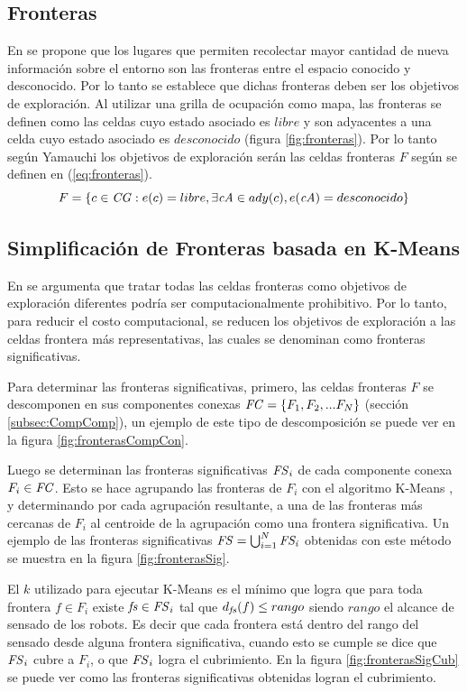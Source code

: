 \subsection{Fronteras}
En \cite{yamauchi1998frontier} se propone que los lugares que permiten
recolectar mayor cantidad de nueva información sobre el entorno son las
fronteras entre el espacio conocido y desconocido. Por lo tanto se establece que dichas
fronteras deben ser los objetivos de exploración.
Al utilizar una grilla de ocupación como mapa, las fronteras se definen como las
celdas cuyo estado asociado es $libre$ y son adyacentes a una celda cuyo estado
asociado es $desconocido$ (figura \ref{fig:fronteras}).
Por lo tanto según Yamauchi los objetivos de exploración serán las celdas
fronteras $F$ según se definen en (\ref{eq:fronteras}).
\begin{equation} 
  F = \{ c \in \mathit{CG} : e(c) = libre, \exists \mathit{cA} \in ady(c), e(\mathit{cA}) = desconocido  \}
  \label{eq:fronteras}
\end{equation}

\subsection{Simplificación de Fronteras basada en K-Means}
En \cite{Amorin2019} se argumenta que tratar todas las celdas fronteras como
objetivos de exploración diferentes podría ser computacionalmente prohibitivo.
Por lo tanto, para reducir el costo computacional, se reducen los objetivos de
exploración a las celdas frontera más representativas, las cuales se
denominan como fronteras significativas.

Para determinar las fronteras significativas, primero, las celdas fronteras $F$
se descomponen en sus componentes conexas $\mathit{FC}=\{F_1,F_2,...F_N\}$
(sección \ref{subsec:CompComp}), un ejemplo de este tipo de descomposición se
puede ver en la figura \ref{fig:fronterasCompCon}.

Luego se determinan las fronteras significativas $\mathit{FS}_i$ de cada
componente conexa $F_i\in \mathit{FC}$. Esto se hace agrupando las fronteras de
$F_i$ con el algoritmo K-Means \cite{macqueen1967some}, y determinando por cada
agrupación resultante, a una de las fronteras más cercanas de $F_i$ al
centroide de la agrupación como una frontera significativa. Un ejemplo de
las fronteras significativas $\mathit{FS} = \bigcup_{i=1}^N \mathit{FS_i}$ obtenidas
con este método se muestra en la figura \ref{fig:fronterasSig}.

El $k$ utilizado para ejecutar K-Means es el mínimo que logra que para toda
frontera $f\in F_i$ existe $\mathit{fs} \in \mathit{FS}_i$ tal que $d_{\mathit{fs}}(f) \leq
rango$ siendo $rango$ el alcance de sensado de los robots. Es decir que %
cada frontera está dentro del rango del sensado desde alguna frontera
significativa, cuando esto se cumple se dice que $\mathit{FS}_i$ cubre a $F_i$, o
que $\mathit{FS}_i$ logra el cubrimiento. En la figura \ref{fig:fronterasSigCub} se
puede ver como las fronteras significativas obtenidas logran el cubrimiento.

